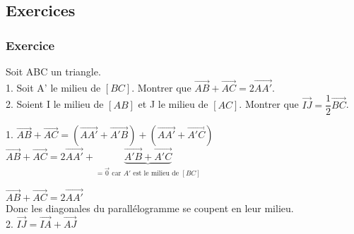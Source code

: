 \newpage

\subsection{Exercices}

\subsubsection{Exercice }

Soit ABC un triangle. \\

1. Soit A' le milieu de $\left[BC\right]$. Montrer que $\overrightarrow{AB} + \overrightarrow{AC} = 2\overrightarrow{AA'}$. \\

2. Soient I le milieu de $\left[AB\right]$ et J le milieu de $\left[AC\right]$. Montrer que $\overrightarrow{IJ} = \dfrac{1}{2} \overrightarrow{BC}$.


1. $\overrightarrow{AB} + \overrightarrow{AC} = \left(\overrightarrow{AA'} + \overrightarrow{A'B}\right) + \left(\overrightarrow{AA'} + \overrightarrow{A'C}\right) $\\

$ \overrightarrow{AB} + \overrightarrow{AC} = 2 \overrightarrow{AA'} + \underbrace{\overrightarrow{A'B} + \overrightarrow{A'C}}_{= \overrightarrow{0} \textrm{ car } A' \textrm { est le milieu de } \left[BC\right]} $

$ \overrightarrow{AB} + \overrightarrow{AC} = 2 \overrightarrow{AA'} $\\

Donc les diagonales du parallélogramme se coupent en leur milieu. \\

2. $ \overrightarrow{IJ} = \overrightarrow{IA} + \overrightarrow{AJ} $\\


